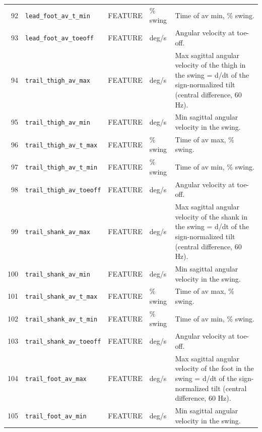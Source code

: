 \begin{longtable}{@{}r p{3.6cm} p{1.55cm} p{1.15cm} p{8.6cm}@{}}
92 & \texttt{lead\_\allowbreak{}foot\_\allowbreak{}av\_\allowbreak{}t\_\allowbreak{}min} & FEATURE & \% swing & Time of av min, \% swing. \\
93 & \texttt{lead\_\allowbreak{}foot\_\allowbreak{}av\_\allowbreak{}toeoff} & FEATURE & deg/s & Angular velocity at toe-off. \\
94 & \texttt{trail\_\allowbreak{}thigh\_\allowbreak{}av\_\allowbreak{}max} & FEATURE & deg/s & Max sagittal angular velocity of the thigh in the swing = d/dt of the sign-normalized tilt (central difference, 60 Hz). \\
95 & \texttt{trail\_\allowbreak{}thigh\_\allowbreak{}av\_\allowbreak{}min} & FEATURE & deg/s & Min sagittal angular velocity in the swing. \\
96 & \texttt{trail\_\allowbreak{}thigh\_\allowbreak{}av\_\allowbreak{}t\_\allowbreak{}max} & FEATURE & \% swing & Time of av max, \% swing. \\
97 & \texttt{trail\_\allowbreak{}thigh\_\allowbreak{}av\_\allowbreak{}t\_\allowbreak{}min} & FEATURE & \% swing & Time of av min, \% swing. \\
98 & \texttt{trail\_\allowbreak{}thigh\_\allowbreak{}av\_\allowbreak{}toeoff} & FEATURE & deg/s & Angular velocity at toe-off. \\
99 & \texttt{trail\_\allowbreak{}shank\_\allowbreak{}av\_\allowbreak{}max} & FEATURE & deg/s & Max sagittal angular velocity of the shank in the swing = d/dt of the sign-normalized tilt (central difference, 60 Hz). \\
100 & \texttt{trail\_\allowbreak{}shank\_\allowbreak{}av\_\allowbreak{}min} & FEATURE & deg/s & Min sagittal angular velocity in the swing. \\
101 & \texttt{trail\_\allowbreak{}shank\_\allowbreak{}av\_\allowbreak{}t\_\allowbreak{}max} & FEATURE & \% swing & Time of av max, \% swing. \\
102 & \texttt{trail\_\allowbreak{}shank\_\allowbreak{}av\_\allowbreak{}t\_\allowbreak{}min} & FEATURE & \% swing & Time of av min, \% swing. \\
103 & \texttt{trail\_\allowbreak{}shank\_\allowbreak{}av\_\allowbreak{}toeoff} & FEATURE & deg/s & Angular velocity at toe-off. \\
104 & \texttt{trail\_\allowbreak{}foot\_\allowbreak{}av\_\allowbreak{}max} & FEATURE & deg/s & Max sagittal angular velocity of the foot in the swing = d/dt of the sign-normalized tilt (central difference, 60 Hz). \\
105 & \texttt{trail\_\allowbreak{}foot\_\allowbreak{}av\_\allowbreak{}min} & FEATURE & deg/s & Min sagittal angular velocity in the swing. \\

\end{longtable}
